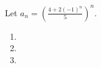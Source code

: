 Let $a_n=(\frac{4+2(-1)^n}{5})^n$.

\begin{enumerate}

    \item 
    \pagebreak
    \item 
    \pagebreak
    \item 

  \end{enumerate}